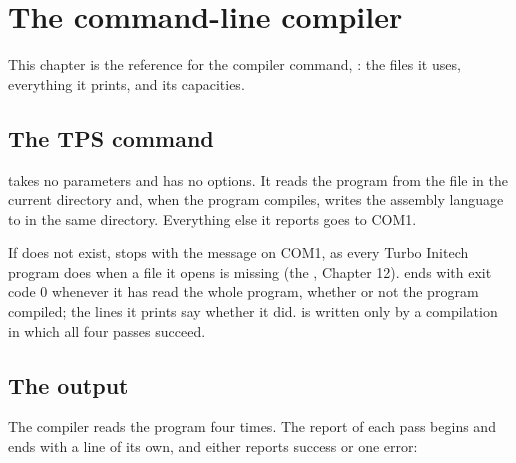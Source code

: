 \chapter{The command-line compiler}

This chapter is the reference for the compiler command, : the
files it uses, everything it prints, and its capacities.

\section{The TPS command}

 takes no parameters and has no options.  It reads the
program from the file  in the current directory and, when
the program compiles, writes the assembly language to  in
the same directory.  Everything else it reports goes to COM1.

If  does not exist,  stops with the message
 on COM1, as every Turbo Initech program does when a
file it opens is missing (the , Chapter 12).
 ends with exit code 0 whenever it has read the whole program,
whether or not the program compiled; the lines it prints say whether it
did.   is written only by a compilation in which all four
passes succeed.

\section{The output}
The compiler reads the program four times.  The report of each pass
begins and ends with a line of its own, and either reports success or one
error:

